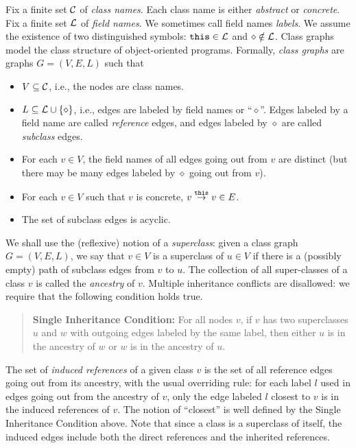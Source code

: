 Fix a finite set ${\cal C}$ of {\em class names}.  Each class name is
either {\em abstract} or {\em concrete}.  Fix a finite set ${\cal L}$ of
{\em field names}.  We sometimes call field names {\em labels}.  We
assume the existence of two distinguished symbols: ${\tt this}\in{\cal L}$ and
$\diamond\notin{\cal L}$.  Class graphs model the class structure of
object-oriented programs.  Formally, {\em class graphs} are graphs
$G=(V,E,L)$ such that
\begin{itemize}
\item $V\subseteq{\cal C}$, i.e., the nodes are class names.
\item $L\subseteq{\cal L}\cup\left\{ \diamond \right\}$, i.e., edges are labeled by
      field names or ``$\diamond$''. Edges labeled by a field name are
      called {\em reference} edges, and edges
      labeled by $\diamond$ are called {\em subclass} edges.
\item For each $v\in V$, the field names of all edges going out from
      $v$ are distinct (but there may be many edges labeled by
      $\diamond$ going out from $v$).
\item For each $v\in V$ such that $v$ is concrete, $v\stackrel{{\tt this}}{\rightarrow}v\in E$.
\item The set of subclass edges is acyclic.
\end{itemize}
%
We shall use the (reflexive) notion of a {\em superclass\/}: given a
class graph $G=(V,E,L)$, we say that $v\in V$ is a superclass of $u\in
V$ if there is a (possibly empty) path of subclass edges from $v$ to
$u$. The collection of all super-classes of a class $v$ is called the
{\em ancestry} of $v$.  Multiple inheritance conflicts are disallowed:
we require that the following condition holds true.
\begin{quote}
{\bf Single Inheritance Condition:} For all nodes $v$, if $v$ has two
superclasses $u$ and $w$ with outgoing edges labeled by the same
label, then either $u$ is in the ancestry of $w$ or $w$ is in the
ancestry of $u$.
\end{quote}
The set of {\em induced references} of a given class $v$ is the set of
all reference edges going out from its ancestry, with the usual
overriding rule: for each label $l$ used in edges going out from the
ancestry of $v$, only the edge labeled $l$ closest to $v$ is in the
induced references of $v$. The notion of ``closest'' is well defined
by the Single Inheritance Condition above.  Note that since a class is
a superclass of itself, the induced edges include both the direct
references and the inherited references.

